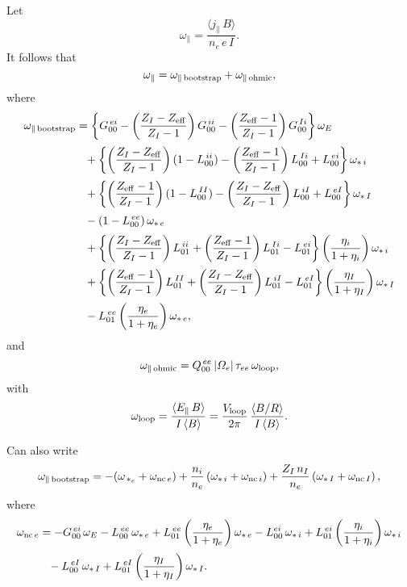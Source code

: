 \documentclass[notitlepage,12pt]{article}
\begin{document}
Let
\begin{equation}
\omega_\parallel = \frac{\langle j_\parallel\,B\rangle}{n_e\,e\,I}.
\end{equation}
It follows that
\begin{equation}
\omega_\parallel =\omega_{\parallel\,{\rm bootstrap}}+\omega_{\parallel\,{\rm ohmic}},
\end{equation}
where
\begin{align}
\omega_{\parallel\,{\rm bootstrap}}&=\left\{G_{00}^{\,ei}-\left(\frac{Z_I-Z_{\rm eff}}{Z_I-1}\right)G^{\,ii}_{00}- \left(\frac{Z_{\rm eff}-1}{Z_I-1}\right)G_{00}^{\,Ii}\right\}\omega_E\nonumber\\[0.5ex]
&\phantom{=} +\left\{\left(\frac{Z_I-Z_{\rm eff}}{Z_I-1}\right)(1-L^{\,ii}_{00}) - \left(\frac{Z_{\rm eff}-1}{Z_I-1}\right)L^{\,Ii}_{00}
+ L^{\,ei}_{00}\right\}\omega_{\ast\,i}\nonumber\\[0.5ex]
&\phantom{=}
+ \left\{\left(\frac{Z_{\rm eff}-1}{Z_I-1}\right)(1-L^{\,II}_{00}) - \left(\frac{Z_I-Z_{\rm eff}}{Z_I-1}\right)L^{\,iI}_{00}
+ L^{\,eI}_{00}\right\}\omega_{\ast\,I}
\nonumber\\[0.5ex]
&\phantom{=}-(1-L^{\,ee}_{00})\,\omega_{\ast\,e}\nonumber\\[0.5ex]
&\phantom{=}+\left\{\left(\frac{Z_I-Z_{\rm eff}}{Z_I-1}\right)L^{\,ii}_{01} + \left(\frac{Z_{\rm eff}-1}{Z_I-1}\right)L^{\,Ii}_{01}
- L^{\,ei}_{01}\right\}\left(\frac{\eta_i}{1+\eta_i}\right)\omega_{\ast\,i}\nonumber\\[0.5ex]
&\phantom{=}
+ \left\{\left(\frac{Z_{\rm eff}-1}{Z_I-1}\right)L^{\,II}_{01} + \left(\frac{Z_I-Z_{\rm eff}}{Z_I-1}\right)L^{\,iI}_{01}
- L^{\,eI}_{01}\right\}\left(\frac{\eta_I}{1+\eta_I}\right)\omega_{\ast\,I}
\nonumber\\[0.5ex]
&\phantom{=}-L^{\,ee}_{01}\left(\frac{\eta_e}{1+\eta_e}\right)\omega_{\ast\,e},
\end{align}
and
\begin{equation}
\omega_{\parallel\,{\rm ohmic}}= Q^{\,ee}_{00}\,|{\mit\Omega}_e|\,\tau_{ee}\,\omega_{\rm loop},
\end{equation}
with
\begin{equation}
\omega_{\rm loop} = \frac{\langle E_\parallel\,B\rangle}{I\,\langle B\rangle}= \frac{V_{\rm loop}}{2\pi}\,\frac{\langle B/R\rangle}{I\,\langle B\rangle}.
\end{equation}

Can also write
\begin{equation}
\omega_{\parallel\,{\rm bootstrap}} = -(\omega_{\,\ast_e} + \omega_{{\rm nc}\,e}) + \frac{n_i}{n_e}\left(\omega_{\ast\,i} + \omega_{{\rm nc}\,i}\right)+ \frac{Z_I\,n_I}{n_e}\left(\omega_{\ast\,I} + \omega_{{\rm nc}\,I}\right),
\end{equation}
where
\begin{align}
\omega_{{\rm nc}\,e} &= -G^{\,ei}_{00}\,\omega_E-L^{\,ee}_{00}\,\omega_{\ast\,e}+L^{\,ee}_{01}\left(\frac{\eta_e}{1+\eta_e}\right)\omega_{\ast\,e} - L_{00}^{ei}\,\omega_{\ast\,i}+L^{\,ei}_{01}\left(\frac{\eta_i}{1+\eta_i}\right)\omega_{\ast\,i}\nonumber\\[0.5ex]
&
\phantom{=}-L^{\,eI}_{00}\,\omega_{\ast\,I}+L^{\,eI}_{01}\left(\frac{\eta_I}{1+\eta_I}\right)\omega_{\ast\,I}.
\end{align}
\end{document}
